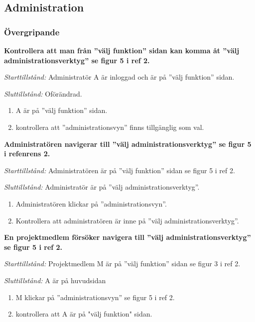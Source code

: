 \documentclass[a4paper]{article}
\begin{document}
\subsection{Administration}

\subsubsection{Övergripande}
\begin{FT}
\item %
\textbf{Kontrollera att man från ''välj funktion'' sidan kan komma åt ''välj administrationsverktyg'' se figur 5 i ref 2.}

\emph{Starttillstånd:}  Administratör A är inloggad och är på ''välj funktion'' sidan.

\emph{Sluttillstånd:} Oförändrad.

\begin{enumerate}
\item A är på ''välj funktion'' sidan.
\item kontrollera att ''administrationsvyn'' finns tillgänglig som val. 

\end{enumerate}

\item %
\textbf{Administratören navigerar till ''välj administrationsverktyg'' se figur 5 i refenrens 2.}

\emph{Starttillstånd:} Administratören är på ''välj funktion'' sidan se figur 5 i ref 2.

\emph{Sluttillstånd:} Administratör är på ''välj administrationsverktyg''.

\begin{enumerate}
\item Administratören klickar på ''administrationsvyn''.
\item Kontrollera att administratören är inne på ''välj administrationsverktyg''.
\end{enumerate}

\item %
\textbf{En projektmedlem försöker navigera till ''välj administrationsverktyg'' se figur 5 i ref 2.}

\emph{Starttillstånd:} Projektmedlem M är på ''välj funktion'' sidan se figur 3 i ref 2.

\emph{Sluttillstånd:} A är på huvudsidan

\begin{enumerate}
\item M klickar på ''administrationsvyn'' se figur 5 i ref 2.
\item kontrollera att A är på "välj funktion" sidan. 
\end{enumerate}


\end{FT}
\end{document}
